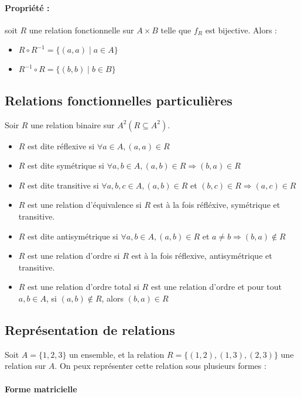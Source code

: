 \documentclass[12pt, a4paper]{report}
\begin{document}
\paragraph{Propriété :} soit $R$ une relation fonctionnelle sur $A\times B$ telle que $f_R$ est bijective. Alors :

\begin{itemize}
\item $R\circ R^{-1} = \{(a,a)\mid a\in A\}$
\item $R^{-1}\circ R = \{(b,b)\mid b\in B\}$
\end{itemize}

\subsection{Relations fonctionnelles particulières}
Soir $R$ une relation binaire sur $A^2 (R\subseteq A^2)$.

\begin{itemize}
\item $R$ est dite réflexive si $\forall a\in A, (a,a)\in R$
\item $R$ est dite symétrique si $\forall a, b\in A, (a,b)\in R \Rightarrow (b,a)\in R$
\item $R$ est dite transitive si $\forall a, b, c\in A, (a,b)\in R$ et $(b,c)\in R \Rightarrow (a,c)\in R$
\item $R$ est une relation d'équivalence si $R$ est à la fois réfléxive, symétrique et transitive.
\item $R$ est dite antisymétrique si $\forall a, b\in A, (a,b)\in R$ et $a\neq b \Rightarrow (b,a)\not\in R$
\item $R$ est une relation d'ordre si $R$ est à la fois réflexive, antisymétrique et transitive.
\item $R$ est une relation d'ordre total si $R$ est une relation d'ordre et pour tout $a, b\in A$, si $(a,b) \not\in R$, alors $(b,a)\in R$
\end{itemize}

\subsection{Représentation de relations}

Soit $A = \{1,2,3\}$ un ensemble, et la relation $R = \{(1,2),(1,3),(2,3)\}$ une relation sur $A$. On peux représenter cette relation sous plusieurs formes :

\paragraph{Forme matricielle}
\end{document}
